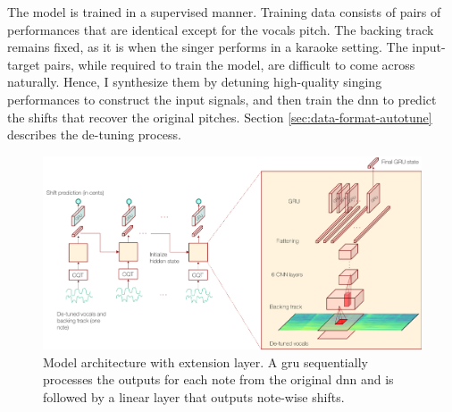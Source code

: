 The model is trained in a supervised manner. Training data consists of pairs of performances that are identical except for the vocals pitch. The backing track remains fixed, as it is when the singer performs in a karaoke setting. The input-target pairs, while required to train the model, are difficult to come across naturally. Hence, I synthesize them by detuning high-quality singing performances to construct the input signals, and then train the \gls{dnn} to predict the shifts that recover the original pitches. Section \ref{sec:data-format-autotune} describes the de-tuning process.
\begin{figure}[t!]
    \centering
    \includegraphics[width=\columnwidth]{images/model_outline_extension.png}
    \caption{Model architecture with extension layer. A \gls{gru} sequentially processes the outputs for each note from the original \gls{dnn}  and is followed by a linear layer that outputs note-wise shifts.}
    \label{fig:model_outline_extended}
\end{figure}

